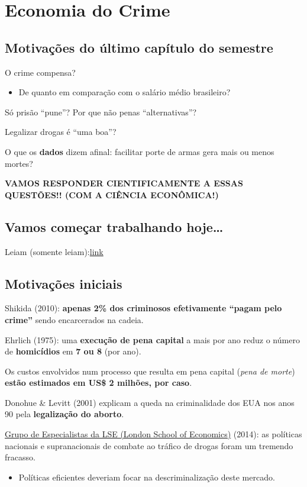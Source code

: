 \documentclass[a4paper,12pt]{article}[abntex2]
\begin{document}
\newpage
\section{\textbf{Economia do Crime}}
\subsection{\textbf{Motivações do último capítulo do semestre}}
O crime compensa?
  \begin{itemize}
    \item De quanto em comparação com o salário médio brasileiro?
  \end{itemize}
Só prisão ``pune''? Por que não penas ``alternativas''?

Legalizar drogas é ``uma boa''?

O que os \textbf{dados} dizem afinal: facilitar porte de armas gera mais ou menos mortes?
                    
\begin{center}
\textbf{VAMOS RESPONDER CIENTIFICAMENTE A ESSAS QUESTÕES!! (COM A CIÊNCIA ECONÔMICA!)}
\end{center}

\subsection{\textbf{Vamos começar trabalhando hoje…}}
Leiam (somente leiam):\href{https://veja.abril.com.br/coluna/direito-e-economia/o-crime-compensa-no-brasil-perguntem-aos-proprios-criminosos/}{link}

\subsection{\textbf{Motivações iniciais}}

Shikida (2010): \textbf{apenas 2\% dos criminosos efetivamente ``pagam pelo crime''} sendo encarcerados na cadeia.

Ehrlich (1975): uma \textbf{execução de pena capital} a mais por ano reduz o número de \textbf{homicídios} em \textbf{7 ou 8} (por ano).

Os custos envolvidos num processo que resulta em pena capital (\textit{pena de morte}) \textbf{estão estimados em US\$ 2 milhões, por caso}.

Donohue \& Levitt (2001) explicam a queda na criminalidade dos EUA nos anos 90 pela \textbf{legalização do aborto}.

\href{https://alinsperedu-my.sharepoint.com/personal/hichamt_al_insper_edu_br/Documents/Insper/Período%206/Direito%20e%20Economia%20das%20Políticas%20Públicas/Materiais%20e%20Aulas%20PPT/LSE-IDEAS-DRUGS-REPORT-FINAL-WEB.pdf}{Grupo de Especialistas da LSE (London School of Economics)} (2014): as políticas nacionais e supranacionais de combate ao tráfico de drogas foram um tremendo fracasso.
\begin{itemize}
  \item Políticas eficientes deveriam focar na descriminalização deste mercado.
\end{itemize}
\end{document}
